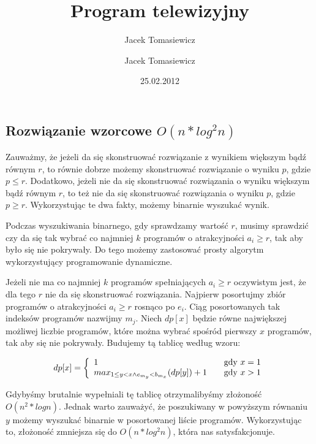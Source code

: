 \documentclass[zad, zawodnik, utf8]{sinol}
\title{Program telewizyjny}
\author{Jacek Tomasiewicz}
\date{25.02.2012}
\author{Jacek Tomasiewicz}
\newcounter{def}
\newcounter{tw}
\newcounter{wn}
\newcounter{obs}
\begin{document}
  \begin{tasktext}%

    \setcounter{def}{1}
    \setcounter{tw}{1}
    \setcounter{wn}{1}
    \setcounter{obs}{1}

    \section{Rozwiązanie wzorcowe $O(n*log^2n)$}
    Zauważmy, że jeżeli da się skonstruować rozwiązanie z wynikiem większym bądź
    równym $r$, to równie dobrze możemy skonstruować rozwiązanie o wyniku $p$,
    gdzie $p \leq r$. Dodatkowo, jeżeli nie da się skonstruować rozwiązania o
    wyniku większym bądź równym $r$, to też nie da się skonstruować rozwiązania
    o wyniku $p$, gdzie $p \geq r$. Wykorzystując te dwa fakty, możemy binarnie
    wyszukać wynik.

    Podczas wyszukiwania binarnego, gdy sprawdzamy wartość $r$, musimy sprawdzić
    czy da się tak wybrać co najmniej $k$ programów o atrakcyjności
    $a_i \geq r$, tak aby było się nie pokrywały. Do tego możemy zastosować
    prosty algorytm wykorzystujący programowanie dynamiczne.

    Jeżeli nie ma co najmniej $k$ programów spełniających $a_i \geq r$
    oczywistym jest, że dla tego $r$ nie da się skonstruować rozwiązania.
    Najpierw posortujmy zbiór programów o atrakcyjności $a_i \geq r$ rosnąco
    po $e_i$. Ciąg posortowanych tak indeksów programów nazwijmy $m_j$. Niech
    $dp[x]$ będzie równe największej możliwej liczbie programów, które można
    wybrać spośród pierwszy $x$ programów, tak aby się nie pokrywały. Budujemy
    tą tablicę według wzoru:

    \[
      dp[x] = \left\{
        \begin{array}{l l}
          1 & \quad \text{gdy $x = 1$} \\
          max_{1 \leq y < x \land e_{m_y} < b_{m_x}}(dp[y]) + 1 & \quad \text{gdy $x > 1$}
        \end{array} \right.
    \]

    Gdybyśmy brutalnie wypełniali tę tablicę otrzymalibyśmy złożoność
    $O(n^2*logn)$. Jednak warto zauważyć, że poszukiwany w powyższym równaniu
    $y$ możemy wyszukać binarnie w posortowanej liście programów. Wykorzystując
    to, złożoność zmniejsza się do $O(n*log^2n)$, która nas satysfakcjonuje.

  \end{tasktext}
\end{document}
